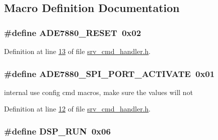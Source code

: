 \subsection{Macro Definition Documentation}
\hypertarget{a00043_af6e27751df5653af1abdb5c1c505b7e1}{
\subsubsection[{A\-D\-E7880\-\_\-\-R\-E\-S\-E\-T}]{\setlength{\rightskip}{0pt plus 5cm}\#define A\-D\-E7880\-\_\-\-R\-E\-S\-E\-T~0x02}}\label{d6/d42/a00043_af6e27751df5653af1abdb5c1c505b7e1}


Definition at line \hyperlink{a00043_source_l00013}{13} of file \hyperlink{a00043_source}{srv\-\_\-cmd\-\_\-handler.\-h}.

\hypertarget{a00043_a430d76623597b550145ee76e95e84c48}{
\subsubsection[{A\-D\-E7880\-\_\-\-S\-P\-I\-\_\-\-P\-O\-R\-T\-\_\-\-A\-C\-T\-I\-V\-A\-T\-E}]{\setlength{\rightskip}{0pt plus 5cm}\#define A\-D\-E7880\-\_\-\-S\-P\-I\-\_\-\-P\-O\-R\-T\-\_\-\-A\-C\-T\-I\-V\-A\-T\-E~0x01}}\label{d6/d42/a00043_a430d76623597b550145ee76e95e84c48}


internal use config cmd macros, make sure the values will not 



Definition at line \hyperlink{a00043_source_l00012}{12} of file \hyperlink{a00043_source}{srv\-\_\-cmd\-\_\-handler.\-h}.

\hypertarget{a00043_a1805e103988f08b8fac817624918cf47}{
\subsubsection[{D\-S\-P\-\_\-\-R\-U\-N}]{\setlength{\rightskip}{0pt plus 5cm}\#define D\-S\-P\-\_\-\-R\-U\-N~0x06}}\label{d6/d42/a00043_a1805e103988f08b8fac817624918cf47}



